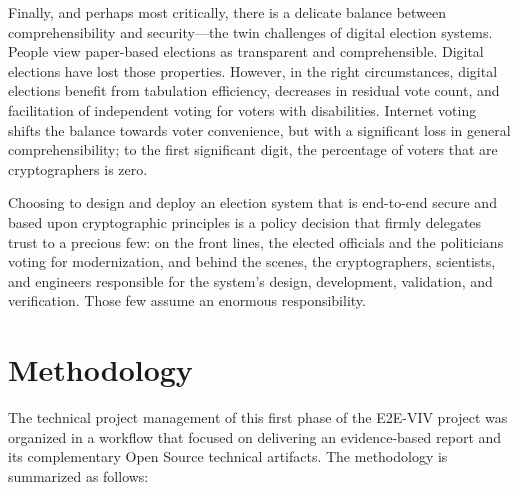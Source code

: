 Finally, and perhaps most critically, there is a delicate balance
between comprehensibility and security---the twin challenges of
digital election systems. People view paper-based elections as
transparent and comprehensible. Digital elections have lost those
properties. However, in the right circumstances, digital elections
benefit from tabulation efficiency, decreases in residual vote count,
and facilitation of independent voting for voters with
disabilities. Internet voting shifts the balance towards voter
convenience, but with a significant loss in general comprehensibility;
to the first significant digit, the percentage of voters that are
cryptographers is zero.

Choosing to design and deploy an election system that is end-to-end
secure and based upon cryptographic principles is a policy decision
that firmly delegates trust to a precious few: on the front lines, the
elected officials and the politicians voting for modernization, and
behind the scenes, the cryptographers, scientists, and engineers
responsible for the system’s design, development, validation, and
verification. Those few assume an enormous responsibility.

\section{Methodology}

The technical project management of this first phase of the E2E-VIV
project was organized in a workflow that focused on delivering an
evidence-based report and its complementary Open Source technical
artifacts. The methodology is summarized as follows:

